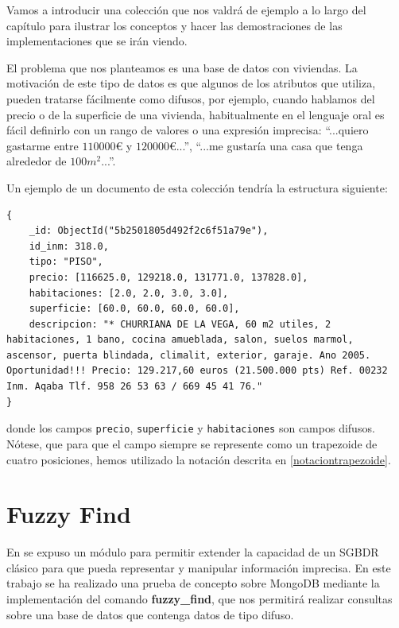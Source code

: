 \begin{example}
Vamos a introducir una colección que nos valdrá de ejemplo a lo largo del capítulo para ilustrar los conceptos y hacer las demostraciones de las implementaciones que se irán viendo.

El problema que nos planteamos es una base de datos con viviendas. La motivación de este tipo de datos es que algunos de los atributos que utiliza, pueden tratarse fácilmente como difusos, por ejemplo, cuando hablamos del precio o de la superficie de una vivienda, habitualmente en el lenguaje oral es fácil definirlo con un rango de valores o una expresión imprecisa: ``...quiero gastarme entre $110000$€ y $120000$€...'', ``...me gustaría una casa que tenga alrededor de $100m^2$...''.

Un ejemplo de un documento de esta colección tendría la estructura siguiente:

\begin{lstlisting}[numbers=none]
{
    _id: ObjectId("5b2501805d492f2c6f51a79e"),
    id_inm: 318.0,
    tipo: "PISO",
    precio: [116625.0, 129218.0, 131771.0, 137828.0],
    habitaciones: [2.0, 2.0, 3.0, 3.0],
    superficie: [60.0, 60.0, 60.0, 60.0],
    descripcion: "* CHURRIANA DE LA VEGA, 60 m2 utiles, 2 habitaciones, 1 bano, cocina amueblada, salon, suelos marmol, ascensor, puerta blindada, climalit, exterior, garaje. Ano 2005. Oportunidad!!! Precio: 129.217,60 euros (21.500.000 pts) Ref. 00232 Inm. Aqaba Tlf. 958 26 53 63 / 669 45 41 76."
}
\end{lstlisting}

donde los campos \texttt{precio},  \texttt{superficie} y \texttt{habitaciones} son campos difusos. Nótese, que para que el campo siempre se represente como un trapezoide de cuatro posiciones, hemos utilizado la notación descrita en \ref{notaciontrapezoide}.
\end{example}

\section{Fuzzy Find}

En \cite{tesismedina} se expuso un módulo para permitir extender la capacidad de un SGBDR clásico para que pueda representar y manipular información imprecisa. En este trabajo se ha realizado una prueba de concepto sobre MongoDB mediante la implementación del comando \textbf{fuzzy\_find}, que nos permitirá realizar consultas sobre una base de datos que contenga datos de tipo difuso.

